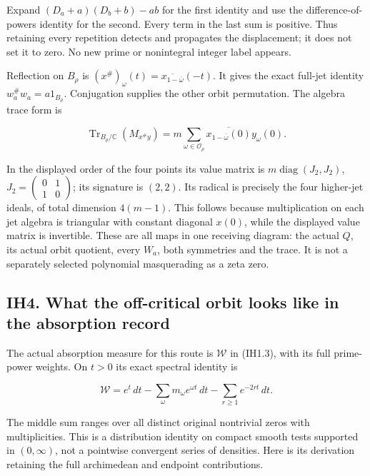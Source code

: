 Expand \((D_a+a)(D_b+b)-ab\) for the first identity and use the
difference-of-powers identity for the second. Every term in the last sum
is positive. Thus retaining every repetition detects and propagates the
displacement; it does not set it to zero. No new prime or nonintegral
integer label appears.

Reflection on \(B_\rho\) is
\((x^\#)_\omega(t)=\overline{x_{1-\overline\omega}}(-t)\). It gives the
exact full-jet identity \(w_a^\#w_a=a1_{B_\rho}\). Conjugation supplies
the other orbit permutation. The algebra trace form is

\[
\operatorname{Tr}_{B_\rho/\mathbb C}(M_{x^\#y})
=m\sum_{\omega\in\mathcal O_\rho}\overline{x_{1-\overline\omega}(0)}y_\omega(0).
\tag{IH3.6}
\]

In the displayed order of the four points its value matrix is
\(m\operatorname{diag}(J_2,J_2)\),
\(J_2=\left(\begin{smallmatrix}0&1\\1&0\end{smallmatrix}\right)\); its
signature is \((2,2)\). Its radical is precisely the four higher-jet
ideals, of total dimension \(4(m-1)\). This follows because
multiplication on each jet algebra is triangular with constant diagonal
\(x(0)\), while the displayed value matrix is invertible. These are all
maps in one receiving diagram: the actual \(Q\), its actual orbit
quotient, every \(W_a\), both symmetries and the trace. It is not a
separately selected polynomial masquerading as a zeta zero.

\subsection{IH4. What the off-critical orbit looks like in the
absorption
record}\label{ih4.-what-the-off-critical-orbit-looks-like-in-the-absorption-record}

The actual absorption measure for this route is \(\mathcal W\) in
(IH1.3), with its full prime-power weights. On \(t>0\) its exact
spectral identity is

\[
\boxed{\mathcal W=e^t\,dt-\sum_\omega m_\omega e^{\omega t}\,dt
-\sum_{r\ge1}e^{-2rt}\,dt.}
\tag{IH4.1}
\]

The middle sum ranges over all distinct original nontrivial zeros with
multiplicities. This is a distribution identity on compact smooth tests
supported in \((0,\infty)\), not a pointwise convergent series of
densities. Here is its derivation retaining the full archimedean and
endpoint contributions.

